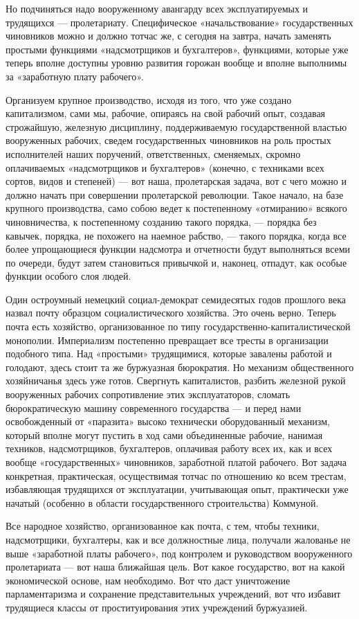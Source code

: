 \documentclass[12pt]{article}
\newcommand{\parnum}{(\arabic{parcount})}
\newcounter{parcount}
\newenvironment{parnumbers}{%
  \par%
  \everypar{\noindent \stepcounter{parcount}\marginpar[]{\parnum}}%
}{}
\begin{document}
\begin{parnumbers}
Но подчиняться надо вооруженному авангарду всех эксплуатируемых и трудящихся — пролетариату. Специфическое «начальствование» государственных чиновников можно и должно тотчас же, с сегодня на завтра, начать заменять простыми функциями «надсмотрщиков и бухгалтеров», функциями, которые уже теперь вполне доступны уровню развития горожан вообще и вполне выполнимы за «заработную плату рабочего».

Организуем крупное производство, исходя из того, что уже создано капитализмом, сами мы, рабочие, опираясь на свой рабочий опыт, создавая строжайшую, железную дисциплину, поддерживаемую государственной властью вооруженных рабочих, сведем государственных чиновников на роль простых исполнителей наших поручений, ответственных, сменяемых, скромно оплачиваемых «надсмотрщиков и бухгалтеров» (конечно, с техниками всех сортов, видов и степеней) — вот наша, пролетарская задача, вот с чего можно и должно начать при совершении пролетарской революции. Такое начало, на базе крупного производства, само собою ведет к постепенному «отмиранию» всякого чиновничества, к постепенному созданию такого порядка, — порядка без кавычек, порядка, не похожего на наемное рабство, — такого порядка, когда все более упрощающиеся функции надсмотра и отчетности будут выполняться всеми по очереди, будут затем становиться привычкой и, наконец, отпадут, как особые функции особого слоя людей.

Один остроумный немецкий социал-демократ семидесятых годов прошлого века назвал почту образцом социалистического хозяйства. Это очень верно. Теперь почта есть хозяйство, организованное по типу государственно-капиталистической монополии. Империализм постепенно превращает все тресты в организации подобного типа. Над «простыми» трудящимися, которые завалены работой и голодают, здесь стоит та же буржуазная бюрократия. Но механизм общественного хозяйничанья здесь уже готов. Свергнуть капиталистов, разбить железной рукой вооруженных рабочих сопротивление этих эксплуататоров, сломать бюрократическую машину современного государства — и перед нами освобожденный от «паразита» высоко технически оборудованный механизм, который вполне могут пустить в ход сами объединенные рабочие, нанимая техников, надсмотрщиков, бухгалтеров, оплачивая работу всех их, как и всех вообще «государственных» чиновников, заработной платой рабочего. Вот задача конкретная, практическая, осуществимая тотчас по отношению ко всем трестам, избавляющая трудящихся от эксплуатации, учитывающая опыт, практически уже начатый (особенно в области государственного строительства) Коммуной.

Все народное хозяйство, организованное как почта, с тем, чтобы техники, надсмотрщики, бухгалтеры, как и все должностные лица, получали жалованье не выше «заработной платы рабочего», под контролем и руководством вооруженного пролетариата — вот наша ближайшая цель. Вот какое государство, вот на какой экономической основе, нам необходимо. Вот что даст уничтожение парламентаризма и сохранение представительных учреждений, вот что избавит трудящиеся классы от проституирования этих учреждений буржуазией.
\end{parnumbers}
\end{document}
